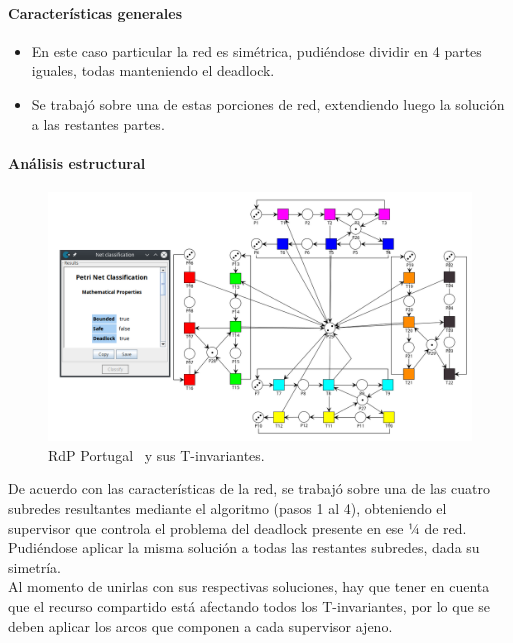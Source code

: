 \paragraph{Características generales}
\begin{itemize}
    \item En este caso particular la red es simétrica, pudiéndose dividir en 4 partes iguales, todas manteniendo el deadlock.
    \item Se trabajó sobre una de estas porciones de red, extendiendo luego la solución a las restantes partes.
\end{itemize}
\bigskip

\newpage
\paragraph{Análisis estructural}
\hfill

\begin{figure}[H]
	\centering
	\includegraphics[scale= 0.45]{Figures/algoritmo3/Portugal1.png}
	\caption[RdP Portugal y sus T-invariantes.]{RdP Portugal \footnotemark \ y sus T-invariantes.}
	\label{fig:portugal_T-invariantes}
 \end{figure} 


De acuerdo con las características de la red, se trabajó sobre una de las cuatro subredes resultantes mediante el algoritmo (pasos 1 al 4), obteniendo el supervisor que controla el problema del deadlock presente en ese ¼ de red.\\
Pudiéndose aplicar la misma solución a todas las restantes subredes, dada su simetría.\\
Al momento de unirlas con sus respectivas soluciones, hay que tener en cuenta que el recurso compartido está afectando todos los T-invariantes, por lo que se deben aplicar los arcos que componen a cada supervisor ajeno.\\

